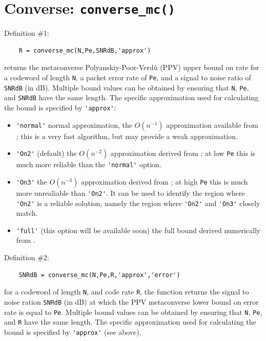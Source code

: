 \documentclass[a4paper,11p]{memoir}
\begin{document}
\section{Converse: \texttt{converse\_mc()}}

Definition \#1:
\begin{verbatim}
	R = converse_mc(N,Pe,SNRdB,'approx')
\end{verbatim}

\noindent returns the metaconverse Polyanskiy-Poor-Verd\`u (PPV) upper bound on rate for a codeword of length \verb|N|, a packet error rate of \verb|Pe|, and a signal to noise ratio of \verb|SNRdB| (in dB). Multiple bound values can be obtained by ensuring that \verb|N|, \verb|Pe|, and \verb|SNRdB| have the same length. The specific approximation used for calculating the bound is specified by \verb|'approx'|:
\begin{itemize}
\item \verb|'normal'| normal approximation, the  $O(n^{-1})$ approximation available from \cite[Fig.~6, 3rd block]{erseghe2015coding}; this is a
               very fast algorithm, but may provide a weak approximation.
\item \verb|'On2'| (default) the $O(n^{-2})$ approximation derived from \cite[Fig.~6, 2nd block]{erseghe2015coding};  at low \verb|Pe| this
is much more reliable  than the \verb|'normal'| option.
\item \verb|'On3'|  the $O(n^{-3})$ approximation derived from \cite[Fig.~6, 2nd block]{erseghe2015coding}; at high \verb|Pe| this is much more unrealiable than \verb|'On2'|. 
               It can  be used to identify the region where \verb|'On2'| is a 
               reliable solution, namely the region where \verb|'On2'| and \verb|'On3'| 
               closely match.
\item \verb|'full'| (this option will be available soon) the full bound derived
               numerically from \cite[Fig.~6, 1st block]{erseghe2015coding}.
\end{itemize}

\vspace*{5mm}

\noindent Definition \#2:
\begin{verbatim}
	SNRdB = converse_mc(N,Pe,R,'approx','error')
\end{verbatim}

\noindent for a codeword of length  \verb|N|, and code rate \verb|R|, the function returns the signal to noise ration \verb|SNRdB| (in dB) at which the PPV metaconverse lower bound on error rate is equal to \verb|Pe|. Multiple bound values can be 
 obtained by ensuring that \verb|N|, \verb|Pe|, and \verb|R| have the same length. The specific
 approximation used for calculating the bound is specified by \verb|'approx'| (see above).
\end{document}
